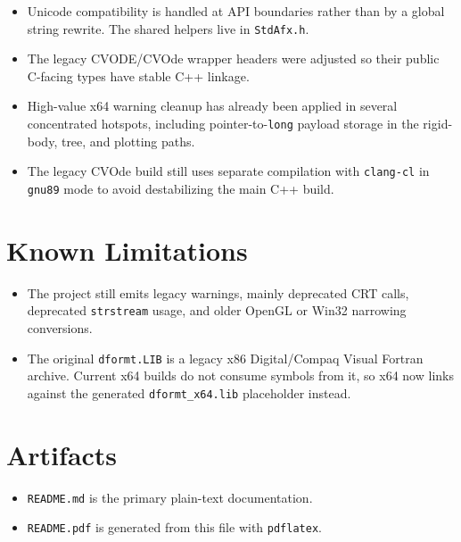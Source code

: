 \documentclass[11pt]{article}
\begin{document}
\begin{itemize}[leftmargin=*]
\item Unicode compatibility is handled at API boundaries rather than by a global string rewrite. The shared helpers live in \texttt{StdAfx.h}.
\item The legacy CVODE/CVOde wrapper headers were adjusted so their public C-facing types have stable C++ linkage.
\item High-value x64 warning cleanup has already been applied in several concentrated hotspots, including pointer-to-\texttt{long} payload storage in the rigid-body, tree, and plotting paths.
\item The legacy CVOde build still uses separate compilation with \texttt{clang-cl} in \texttt{gnu89} mode to avoid destabilizing the main C++ build.
\end{itemize}

\section*{Known Limitations}

\begin{itemize}[leftmargin=*]
\item The project still emits legacy warnings, mainly deprecated CRT calls, deprecated \texttt{strstream} usage, and older OpenGL or Win32 narrowing conversions.
\item The original \texttt{dformt.LIB} is a legacy x86 Digital/Compaq Visual Fortran archive. Current x64 builds do not consume symbols from it, so x64 now links against the generated \texttt{dformt\_x64.lib} placeholder instead.
\end{itemize}

\section*{Artifacts}

\begin{itemize}[leftmargin=*]
\item \texttt{README.md} is the primary plain-text documentation.
\item \texttt{README.pdf} is generated from this file with \texttt{pdflatex}.
\end{itemize}
\end{document}
